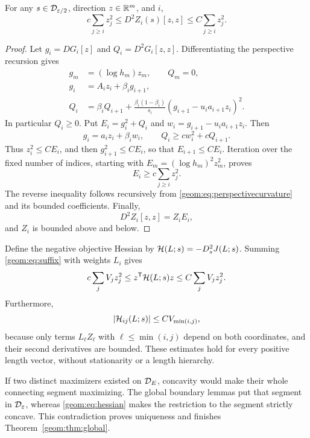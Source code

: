 \begin{lemma}
\label{geom:lem:suffix}
For any \(s\in\mathcal D_{\varepsilon/2}\), direction \(z\in\mathbb R^m\), and \(i\),
\begin{equation}
 c\sum_{j\ge i}z_j^2\le D^2Z_i(s)[z,z]
                   \le C\sum_{j\ge i}z_j^2.      \label{geom:eq:suffix}
\end{equation}
\end{lemma}

\begin{proof}
Let \(g_i=DG_i[z]\) and \(Q_i=D^2G_i[z,z]\).  Differentiating the
perspective recursion gives
\begin{align}
 g_m&=(\log h_m)z_m,\qquad Q_m=0,\nonumber\\
 g_i&=A_i z_i+\beta_i g_{i+1},\nonumber\\
 Q_i&=\beta_iQ_{i+1}
  +\frac{\beta_i(1-\beta_i)}{s_i}
              (g_{i+1}-u_i a_{i+1}z_i)^2.        \label{geom:eq:perspectivecurvature}
\end{align}
In particular \(Q_i\ge0\).  Put \(E_i=g_i^2+Q_i\) and
\(w_i=g_{i+1}-u_i a_{i+1}z_i\).  Then
\[
 g_i=a_i z_i+\beta_iw_i,\qquad
 Q_i\ge c w_i^2+cQ_{i+1}.
\]
Thus \(z_i^2\le CE_i\), and then \(g_{i+1}^2\le CE_i\), so that
\(E_{i+1}\le CE_i\).  Iteration over the fixed number of indices,
starting with \(E_m=(\log h_m)^2z_m^2\), proves
\[
 E_i\ge c\sum_{j\ge i}z_j^2.
\]
The reverse inequality follows recursively from
\eqref{geom:eq:perspectivecurvature} and its bounded coefficients.
Finally,
\[
 D^2Z_i[z,z]=Z_iE_i,
\]
and \(Z_i\) is bounded above and below.
\end{proof}

Define the negative objective Hessian by
\(\mathcal H(L;s)=-D_s^2J(L;s)\).
Summing \eqref{geom:eq:suffix} with weights \(L_i\) gives
\begin{equation}
 c\sum_jV_j z_j^2
 \le z^{\mathsf T}\mathcal H(L;s)z
 \le C\sum_jV_j z_j^2.                            \label{geom:eq:hessian}
\end{equation}
Furthermore,
\begin{equation}
 |\mathcal H_{ij}(L;s)|\le C V_{\min(i,j)},             \label{geom:eq:hessianentry}
\end{equation}
because only terms \(L_\ell Z_\ell\) with \(\ell\le\min(i,j)\)
depend on both coordinates, and their second derivatives are bounded.
These estimates hold for every positive length vector, without
stationarity or a length hierarchy.

If two distinct maximizers existed on \(\mathcal D_E\), concavity would
make their whole connecting segment maximizing.  The global boundary
lemmas put that segment in \(\mathcal D_\varepsilon\), whereas
\eqref{geom:eq:hessian} makes the restriction to the segment strictly concave.
This contradiction proves uniqueness and finishes
Theorem~\ref{geom:thm:global}.

